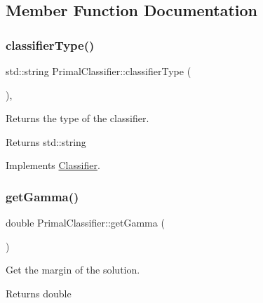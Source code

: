 \subsection{Member Function Documentation}
\mbox{\label{class_primal_classifier_af5117ae286ed7f06430b98f433e9bf62}} 
\subsubsection{\texorpdfstring{classifier\+Type()}{classifierType()}}
{\footnotesize\ttfamily std\+::string Primal\+Classifier\+::classifier\+Type (\begin{DoxyParamCaption}{ }\end{DoxyParamCaption})\hspace{0.3cm}{\ttfamily [inline]}, {\ttfamily [virtual]}}



Returns the type of the classifier. 

\begin{DoxyReturn}{Returns}
std\+::string 
\end{DoxyReturn}


Implements \hyperlink{class_classifier_a7bfe7cc88b851b4a7e7ec55b30dd844e}{Classifier}.

\mbox{\label{class_primal_classifier_a320c67c29eeb85d5d05f7db1de7fde41}} 
\subsubsection{\texorpdfstring{get\+Gamma()}{getGamma()}}
{\footnotesize\ttfamily double Primal\+Classifier\+::get\+Gamma (\begin{DoxyParamCaption}{ }\end{DoxyParamCaption})}



Get the margin of the solution. 

\begin{DoxyReturn}{Returns}
double 
\end{DoxyReturn}
\mbox{\label{class_primal_classifier_a1a3d9ba4e80c58418db0d8454168b910}} 
